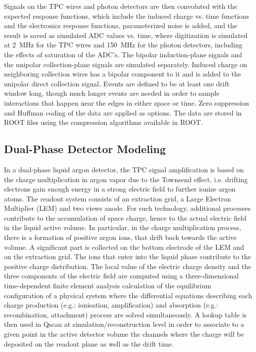 Signals on the TPC wires and photon detectors are then convoluted with
the expected response functions, which include the induced charge
vs. time functions and the electronics response functions,
parameterized noise is added, and the result is saved as simulated ADC
values vs. time, where digitization is simulated at 2~MHz for the TPC
wires and 150~MHz for the photon detectors, including the effects of
saturation of the ADC's.  The bipolar induction-plane signals and the
unipolar collection-plane signals are simulated separately.  Induced
charge on neighboring collection wires has a bipolar component to it
and is added to the unipolar direct collection signal.  Events are
defined to be at least one drift window long, though much longer
events are needed in order to sample interactions that happen near the
edges in either space or time.  Zero suppression and Huffman coding of
the data are applied as options.  The data are stored in ROOT files
using the compression algorithms available in ROOT.

\subsection{Dual-Phase Detector Modeling}

In a dual-phase liquid argon detector, the TPC signal amplification 
is based on the charge multiplication in argon vapor due to the Townsend effect, 
i.e. drifting electrons gain enough energy in a strong electric field to further ionize argon atoms. 
The readout system consists of an extraction grid, a Large Electron Multiplier (LEM) and two views anode.
For such technology, additional processes contribute to the
accumulation of space charge, hence to the actual electric field in the liquid active volume.
In particular, in the charge multiplication process, there is a formation of positive argon ions, 
that drift back towards the active volume. 
A significant part is collected on the bottom electrode of the LEM and on the extraction grid. 
The ions that enter into the liquid phase contribute to the positive charge distribution.
The local value of the electric charge density and the three components of the electric field
are computed using a three-dimensional time-dependent finite element analysis calculation of the equilibrium 
configuration of a physical system where the differential equations describing each charge production (e.g.: ionisation, amplification) and
absorption (e.g.: recombination, attachment) process are solved simultaneously. 
A lookup table is then used in Qscan at simulation/reconstruction level in order to associate to a given point in the active
detector volume the channels where the charge will be deposited on the readout plane as well as the drift time.

